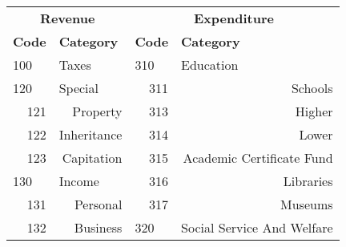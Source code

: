 \begin{tabular}{@{}rr|r|r|@{}}
\multicolumn{2}{c}{\textbf{Revenue}}                                                                     & \multicolumn{2}{c|}{\textbf{Expenditure}}                                                                               \\
\multicolumn{1}{|l|}{\textbf{Code}} & \multicolumn{1}{l|}{\textbf{Category}}                             & \multicolumn{1}{l|}{\textbf{Code}} & \multicolumn{1}{l|}{\textbf{Category}}                                             \\
\multicolumn{1}{|l|}{100}           & \multicolumn{1}{l|}{Taxes}                                         & \multicolumn{1}{l|}{310}           & \multicolumn{1}{l|}{Education}                                                     \\
\multicolumn{1}{|l|}{120}           & \multicolumn{1}{l|}{Special}                                       & 311                                & Schools                                                                            \\
\multicolumn{1}{|r|}{121}           & Property                                                           & 313                                & Higher                                                                             \\
\multicolumn{1}{|r|}{122}           & Inheritance                                                        & 314                                & Lower                                                                              \\
\multicolumn{1}{|r|}{123}           & Capitation                                                         & 315                                & Academic Certificate Fund                                                          \\
\multicolumn{1}{|l|}{130}           & \multicolumn{1}{l|}{Income}                                        & 316                                & Libraries                                                                          \\
\multicolumn{1}{|r|}{131}           & Personal                                                           & 317                                & Museums                                                                            \\
\multicolumn{1}{|r|}{132}           & Business                                                           & \multicolumn{1}{l|}{320}           & \multicolumn{1}{l|}{Social Service And Welfare}                                    \\

\end{tabular}
